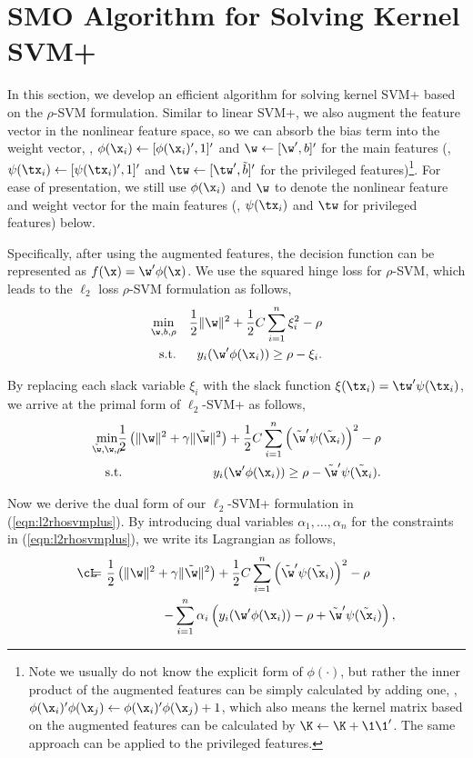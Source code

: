 \section{SMO Algorithm for Solving Kernel SVM+}
In this section, we develop an efficient algorithm for solving kernel SVM+ based on the $\rho$-SVM formulation. Similar to linear SVM+, we also augment the feature vector in the nonlinear feature space, so we can absorb the bias term into the weight vector, \ie, $\phi(\x_i) \leftarrow [\phi(\x_i)', 1]'$ and $\w \leftarrow [\w', b]'$ for the main features (\resp,  $\psi(\tx_i) \leftarrow [\psi(\tx_i)', 1]'$ and $\tw \leftarrow [\tw', \tilde{b}]'$ for the privileged features)\footnote{Note we usually do not know the explicit form of $\phi(\cdot)$, but rather the inner product of the augmented features can be simply calculated by adding one, \ie, $\phi(\x_i)'\phi(\x_j)\leftarrow\phi(\x_i)'\phi(\x_j) + 1$, which also means the kernel matrix based on the augmented features can be calculated by $\K \leftarrow \K + \1\1'$. The same approach can be applied to the privileged features. }. For ease of presentation, we still use $\phi(\x_i)$ and $\w$ to denote the nonlinear feature and weight vector for the main features (\resp, $\psi(\tx_i)$ and $\tw$ for privileged features) below.

Specifically, after using the augmented features, the decision function can be represented as $f(\x) = \w'\phi(\x)$.  We use the squared hinge loss for $\rho$-SVM, which leads to the $\ell_2$ loss $\rho$-SVM formulation as follows,
\begin{eqnarray}\label{eqn:l2rhosvm}
\min_{\w, b, \rho} && \frac{1}{2}\|\w\|^2 + \frac{1}{2}C\sum_{i=1}^{n}\xi_i^2 - \rho\\
\mbox{s.t.} && y_i(\w'\phi(\x_i)) \geq \rho - \xi_i.\nonumber
\end{eqnarray}

By replacing each slack variable $\xi_i$ with the slack function $\xi(\tx_i) = \tw'\psi(\tx_i)$, we arrive at the primal form of $\ell_2$-SVM+ as follows,
\begin{eqnarray}\label{eqn:l2rhosvmplus}
\min_{\tilde{\w}, \w, \rho}\!\!\!\!&&\!\!\!\!\frac{1}{2}\left(\|\w\|^2 + \gamma\|\tilde{\w}\|^2\right)+ \frac{1}{2}C\sum_{i=1}^{n}\left(\tilde{\w}'\psi(\tilde{\x}_i)\right)^2 - \rho\nonumber\\
\mbox{s.t.}\!\!\!\!&&\!\!\!\! y_i(\w'\phi(\x_i)) \geq \rho - \tilde{\w}'\psi(\tilde{\x}_i).
\end{eqnarray}

Now we derive the dual form of our $\ell_2$-SVM+ formulation in (\ref{eqn:l2rhosvmplus}). By introducing dual variables $\alpha_1, \ldots, \alpha_n$ for the constraints in (\ref{eqn:l2rhosvmplus}), we write its Lagrangian as follows,
\begin{eqnarray}\label{eqn:l2svmplus_lagrangian}
\cL\!\!\!\!&=&\!\!\!\!\frac{1}{2}\left(\|\w\|^2 + \gamma\|\tilde{\w}\|^2\right)+ \frac{1}{2}C\sum_{i=1}^{n}\left(\tilde{\w}'\psi(\tilde{\x}_i)\right)^2 - \rho\qquad\\
\!\!\!\!&&\!\!\!\!- \sum_{i=1}^n\alpha_i\left(y_i(\w'\phi(\x_i)) - \rho + \tilde{\w}'\psi(\tilde{\x}_i)\right),\nonumber
\end{eqnarray}

